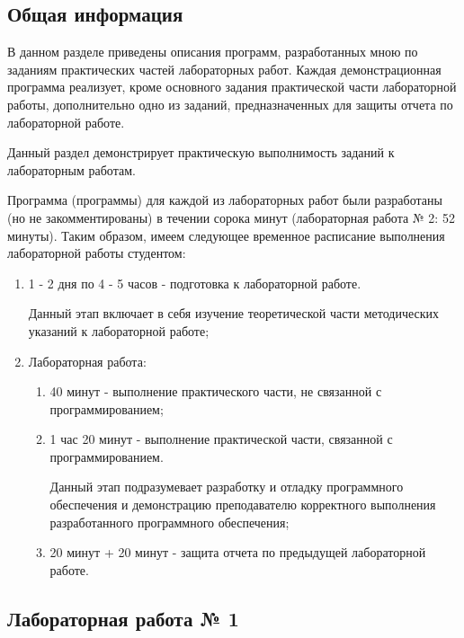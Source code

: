 	\subsection{Общая информация}

	В данном разделе приведены описания программ, разработанных мною по заданиям практических частей лабораторных работ.
	Каждая демонстрационная программа реализует, кроме основного задания
	практической части лабораторной работы, дополнительно одно из заданий, предназначенных для защиты отчета по лабораторной работе.
	
	Данный раздел демонстрирует практическую выполнимость заданий к лабораторным работам.
	
	Программа (программы) для каждой из лабораторных работ были
	разработаны (но не закомментированы) в течении сорока минут (лабораторная работа № 2: 52 минуты).
	Таким образом, имеем следующее временное расписание выполнения лабораторной работы студентом:

	\begin{enumerate}

		\item 1 - 2 дня по 4 - 5 часов - подготовка к лабораторной работе.

			Данный этап включает в себя изучение теоретической части методических указаний к лабораторной работе;

		\item Лабораторная работа:

			\begin{enumerate}

				\item 40 минут - выполнение практического части, не связанной с программированием;
				\item 1 час 20 минут - выполнение практической части, связанной с программированием.

					Данный этап подразумевает разработку и отладку программного обеспечения и демонстрацию преподавателю корректного выполнения разработанного программного обеспечения;

				\item 20 минут + 20 минут - защита отчета по предыдущей лабораторной работе.

			\end{enumerate}

	\end{enumerate}

	\subsection{Лабораторная работа № 1}

